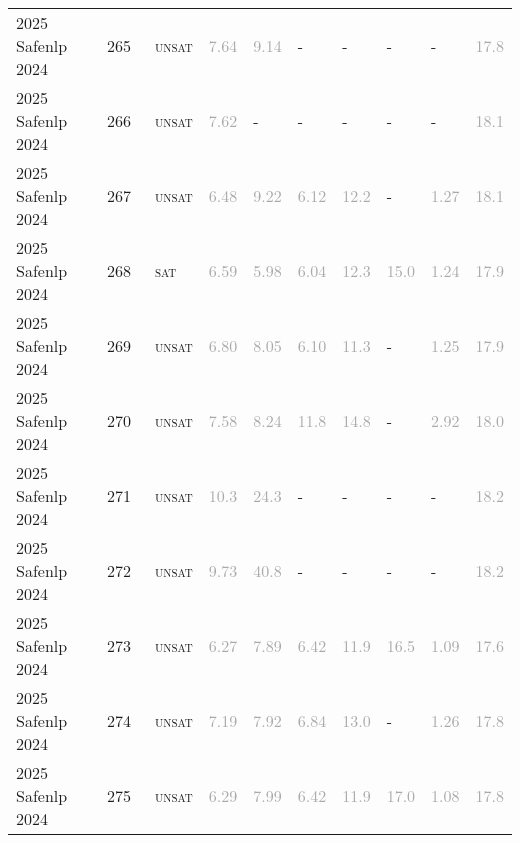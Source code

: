 \begin{center}
{\begin{longtable}{@{}llllllllll@{}}
2025 Safenlp 2024 & 265 & ~\textsc{unsat} & \textcolor{darkgray}{7.64} & \textcolor{darkgray}{9.14} & - & - & - & - & \textcolor{darkgray}{17.8} \\
2025 Safenlp 2024 & 266 & ~\textsc{unsat} & \textcolor{darkgray}{7.62} & - & - & - & - & - & \textcolor{darkgray}{18.1} \\
2025 Safenlp 2024 & 267 & ~\textsc{unsat} & \textcolor{darkgray}{6.48} & \textcolor{darkgray}{9.22} & \textcolor{darkgray}{6.12} & \textcolor{darkgray}{12.2} & - & \textcolor{darkgray}{1.27} & \textcolor{darkgray}{18.1} \\
2025 Safenlp 2024 & 268 & ~\textsc{sat} & \textcolor{darkgray}{6.59} & \textcolor{darkgray}{5.98} & \textcolor{darkgray}{6.04} & \textcolor{darkgray}{12.3} & \textcolor{darkgray}{15.0} & \textcolor{darkgray}{1.24} & \textcolor{darkgray}{17.9} \\
2025 Safenlp 2024 & 269 & ~\textsc{unsat} & \textcolor{darkgray}{6.80} & \textcolor{darkgray}{8.05} & \textcolor{darkgray}{6.10} & \textcolor{darkgray}{11.3} & - & \textcolor{darkgray}{1.25} & \textcolor{darkgray}{17.9} \\
2025 Safenlp 2024 & 270 & ~\textsc{unsat} & \textcolor{darkgray}{7.58} & \textcolor{darkgray}{8.24} & \textcolor{darkgray}{11.8} & \textcolor{darkgray}{14.8} & - & \textcolor{darkgray}{2.92} & \textcolor{darkgray}{18.0} \\
2025 Safenlp 2024 & 271 & ~\textsc{unsat} & \textcolor{darkgray}{10.3} & \textcolor{darkgray}{24.3} & - & - & - & - & \textcolor{darkgray}{18.2} \\
2025 Safenlp 2024 & 272 & ~\textsc{unsat} & \textcolor{darkgray}{9.73} & \textcolor{darkgray}{40.8} & - & - & - & - & \textcolor{darkgray}{18.2} \\
2025 Safenlp 2024 & 273 & ~\textsc{unsat} & \textcolor{darkgray}{6.27} & \textcolor{darkgray}{7.89} & \textcolor{darkgray}{6.42} & \textcolor{darkgray}{11.9} & \textcolor{darkgray}{16.5} & \textcolor{darkgray}{1.09} & \textcolor{darkgray}{17.6} \\
2025 Safenlp 2024 & 274 & ~\textsc{unsat} & \textcolor{darkgray}{7.19} & \textcolor{darkgray}{7.92} & \textcolor{darkgray}{6.84} & \textcolor{darkgray}{13.0} & - & \textcolor{darkgray}{1.26} & \textcolor{darkgray}{17.8} \\
2025 Safenlp 2024 & 275 & ~\textsc{unsat} & \textcolor{darkgray}{6.29} & \textcolor{darkgray}{7.99} & \textcolor{darkgray}{6.42} & \textcolor{darkgray}{11.9} & \textcolor{darkgray}{17.0} & \textcolor{darkgray}{1.08} & \textcolor{darkgray}{17.8} \\

\end{longtable}}
\end{center}
